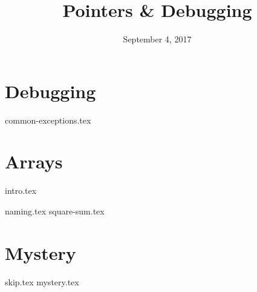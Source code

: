 \documentclass[11pt]{exam}
\title{Pointers \& Debugging}
\date{September 4, 2017}
\begin{document}
\maketitle

\section{Debugging}
\begin{questions}
{common-exceptions.tex}
\end{questions}

\section{Arrays}
{intro.tex}
\begin{questions}
{naming.tex}
{square-sum.tex}
\end{questions}

\section{Mystery}
\begin{questions}
{skip.tex}
{mystery.tex}
\end{questions}
\end{document}
